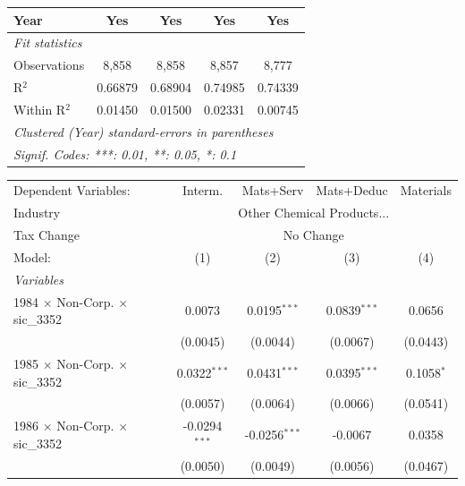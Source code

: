 \documentclass[
  12pt]{article}
\theoremstyle{definition}
\theoremstyle{remark}
\begin{document}
\begin{table}
\begin{minipage}{\linewidth}
\begin{tabular}{lcccc}
   Year                                          & Yes            & Yes            & Yes            & Yes\\  
   \midrule
   \emph{Fit statistics}\\
   Observations                                  & 8,858          & 8,858          & 8,857          & 8,777\\  
   R$^2$                                         & 0.66879        & 0.68904        & 0.74985        & 0.74339\\  
   Within R$^2$                                  & 0.01450        & 0.01500        & 0.02331        & 0.00745\\  
   \midrule \midrule
   \multicolumn{5}{l}{\emph{Clustered (Year) standard-errors in parentheses}}\\
   \multicolumn{5}{l}{\emph{Signif. Codes: ***: 0.01, **: 0.05, *: 0.1}}\\
\end{tabular}
\par\endgroup
\begingroup
\centering
\begin{tabular}{lcccc}
   \tabularnewline \midrule \midrule
   Dependent Variables:                          & Interm.         & Mats+Serv       & Mats+Deduc     & Materials\\  
   Industry & \multicolumn{4}{c}{Other Chemical Products...} \\ 
   Tax Change & \multicolumn{4}{c}{No Change} \\ 
   Model:                                        & (1)             & (2)             & (3)            & (4)\\  
   \midrule
   \emph{Variables}\\
   1984 $\times$ Non-Corp. $\times$ sic\_3352    & 0.0073          & 0.0195$^{***}$  & 0.0839$^{***}$ & 0.0656\\   
                                                 & (0.0045)        & (0.0044)        & (0.0067)       & (0.0443)\\   
   1985 $\times$ Non-Corp. $\times$ sic\_3352    & 0.0322$^{***}$  & 0.0431$^{***}$  & 0.0395$^{***}$ & 0.1058$^{*}$\\   
                                                 & (0.0057)        & (0.0064)        & (0.0066)       & (0.0541)\\   
   1986 $\times$ Non-Corp. $\times$ sic\_3352    & -0.0294$^{***}$ & -0.0256$^{***}$ & -0.0067        & 0.0358\\   
                                                 & (0.0050)        & (0.0049)        & (0.0056)       & (0.0467)\\   

\end{tabular}
\end{minipage}
\end{table}
\end{document}
